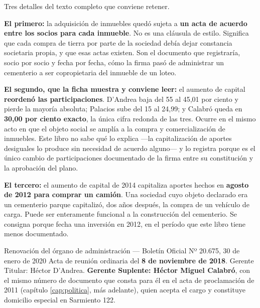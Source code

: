 Tres detalles del texto completo que conviene retener.

\textbf{El primero:} la adquisición de inmuebles quedó sujeta a \textbf{un acta de acuerdo entre los socios para cada inmueble}. No es una cláusula de estilo. Significa que cada compra de tierra por parte de la sociedad debía dejar constancia societaria propia, y que esas actas existen. Son el documento que registraría, socio por socio y fecha por fecha, cómo la firma pasó de administrar un cementerio a ser copropietaria del inmueble de un loteo.

\textbf{El segundo, que la ficha muestra y conviene leer:} el aumento de capital \textbf{reordenó las participaciones}. D'Andrea baja del 55 al 45,01 por ciento y pierde la mayoría absoluta; Palacios sube del 15 al 24,99; y Calabró queda en \textbf{30,00 por ciento exacto}, la única cifra redonda de las tres. Ocurre en el mismo acto en que el objeto social se amplía a la compra y comercialización de inmuebles. Este libro no sabe qué lo explica ---la capitalización de aportes desiguales lo produce sin necesidad de acuerdo alguno--- y lo registra porque es el único cambio de participaciones documentado de la firma entre su constitución y la aprobación del plano.

\textbf{El tercero:} el aumento de capital de 2014 capitaliza aportes hechos en \textbf{agosto de 2012 para comprar un camión}. Una sociedad cuyo objeto declarado era un cementerio parque capitalizó, dos años después, la compra de un vehículo de carga. Puede ser enteramente funcional a la construcción del cementerio. Se consigna porque fecha una inversión en 2012, en el período que este libro tiene menos documentado.

\begin{ficha}{Renovación del órgano de administración --- Boletín Oficial Nº 20.675, 30 de enero de 2020}
Acta de reunión ordinaria del \textbf{8 de noviembre de 2018}. Gerente Titular: Héctor D'Andrea. \textbf{Gerente Suplente: Héctor Miguel Calabró}, con el mismo número de documento que consta para él en el acta de proclamación de 2011 (capítulo \ref{cap:politica}, más adelante), quien acepta el cargo y constituye domicilio especial en Sarmiento 122.
\end{ficha}


